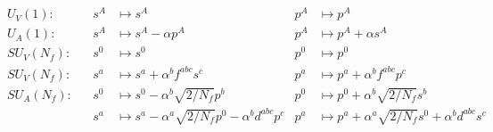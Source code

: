 \begin{subequations}
    \begin{align}
        &  & U_V(1): &  & s^A            & \mapsto s^A & p^A & \mapsto p^A              &  & \\
         &  & U_A(1): &  & s^A            & \mapsto s^A-\alpha p^A                                                              & p^A & \mapsto p^A+\alpha s^A &  & \\
         &  & SU_V(N_f): &  & s^0            & \mapsto s^0                                                    & p^0 & \mapsto p^0               &  & \\
         &  & SU_V(N_f): &  & s^a            & \mapsto s^a+\alpha^bf^{abc}s^c                                                    & p^a & \mapsto p^a+\alpha^bf^{abc}p^c               &  & \\
         &  & SU_A(N_f): &  & s^0& \mapsto s^0-\alpha^b\sqrt{2/N_f}p^b& p^0 & \mapsto p^0+\alpha^b\sqrt{2/N_f}s^b &  & \\
         &  &  &  & s^a& \mapsto s^a-\alpha^a\sqrt{2/N_f}p^0-\alpha^bd^{abc}p^c& p^a & \mapsto p^a+\alpha^a\sqrt{2/N_f}s^0+\alpha^bd^{abc}s^c &  & 
    \end{align}
\end{subequations}

